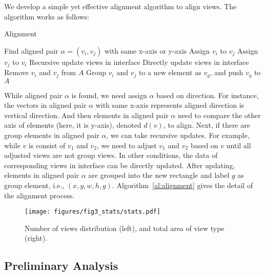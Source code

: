 We develop a simple yet effective alignment algorithm to align views.
The algorithm works as follows:

\begin{algorithm}[H]
\caption{Alignment}
\begin{algorithmic}[1]
\State Find aligned pair $\alpha=(v_{i}, v_{j})$ with same x-axis or y-axis
\State Assign $v_{i}$ to $v_{j}$
\Else
\State Assign $v_{j}$ to $v_{i}$
\EndIf
{}
\State Recursive update views in interface
\Else
\State Directly update views in interface
\EndIf
\State Remove $v_{i}$ and $v_{j}$ from $A$
\State Group $v_{i}$ and $v_{j}$ to a new element as $v_{g}$, and push $v_{g}$ to $A$
\EndWhile
\end{algorithmic}
\label{al:alignment}
\end{algorithm}

While aligned pair $\alpha$ is found, we need assign $\alpha$ based on direction.
For instance, the vectors in aligned pair $\alpha$ with same x-axis represents aligned direction is vertical direction.
And then elements in aligned pair $\alpha$ need to compare the other axis of elements (here, it is y-axis), denoted $d(v)$, to align.
Next, if there are group elements in aligned pair $\alpha$, we can take recursive updates. 
For example, while $v$ is consist of $v_{1}$ and $v_{2}$, we need to adjust $v_{1}$ and $v_{2}$ based on $v$ until all adjusted views are not group views.
In other conditions, the data of corresponding views in interface can be directly updated.
After updating, elements in aligned pair $\alpha$ are grouped into the new rectangle and label $g$ as group element, i.e., $(x, y, w, h, g)$.
Algorithm~\ref{al:alignment} gives the detail of the alignment process.



\begin{figure}[t]
  \centering
  \texttt{[image: figures/fig3\_stats/stats.pdf]} \\{}
  \caption{Number of views distribution (left), and total area of view type (right).}
  \label{fig:vis_stats}
  \vspace*{-3mm}
\end{figure}

\subsection{Preliminary Analysis}
\label{ssec:pre_ana}


